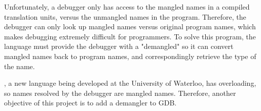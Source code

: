 Unfortunately, a debugger only has access to the mangled names in a compiled
translation units, versus the unmangled names in the program.  Therefore, the
debugger can only look up mangled names versus original program names, which
makes debugging extremely difficult for programmers. To solve this program, the
language must provide the debugger with a "demangled" so it can convert
mangled names back to program names, and correspondingly retrieve the type of
the name. \cite{Reference9}

\CFA, a new language being developed at the University of Waterloo, has
overloading, so names resolved by the debugger are mangled names. Therefore,
another objective of this project is to add a \CFAS demangler to GDB.

